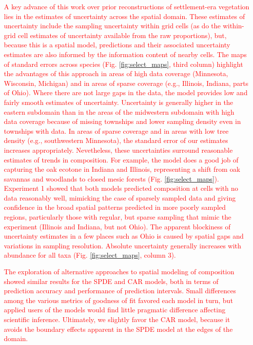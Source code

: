 \documentclass[10pt,letterpaper]{article}
\begin{document}
\textcolor{red}{A key advance of this work over prior reconstructions
of settlement-era vegetation lies in the estimates of uncertainty
across the spatial domain. These estimates of uncertainty include
the sampling uncertainty within grid cells (as do the within-grid
cell estimates of uncertainty available from the raw proportions),
but, because this is a spatial model, predictions and their associated
uncertainty estimates are also informed by the information content
of nearby cells. The maps of standard errors across species (Fig.
\ref{fig:select_maps}, third column) highlight the advantages of
this approach in areas of high data coverage (Minnesota, Wisconsin,
Michigan) and in areas of sparse coverage (e.g., Illinois, Indiana,
parts of Ohio). Where there are not large gaps in the data, the model
provides low and fairly smooth estimates of uncertainty. Uncertainty
is generally higher in the eastern subdomain than in the areas of
the midwestern subdomain with high data coverage because of missing
townships and lower sampling density even in townships with data.
In areas of sparse coverage and in areas with low tree density (e.g.,
southwestern Minnesota), the standard error of our estimates increases
appropriately. Nevetheless, these uncertainties surround reasonable
estimates of trends in composition. For example, the model does a
good job of capturing the oak ecotone in Indiana and Illinois, representing
a shift from oak savannas and woodlands to closed mesic forests (Fig.
\ref{fig:select_maps}). Experiment 1 showed that both models predicted
composition at cells with no data reasonably well, mimicking the case
of sparsely sampled data and giving confidence in the broad spatial
patterns predicted in more poorly sampled regions, particularly those
with regular, but sparse sampling that mimic the experiment (Illinois
and Indiana, but not Ohio). The apparent blockiness of uncertainty
estimates in a few places such as Ohio is caused by spatial gaps and
variations in sampling resolution. Absolute uncertainty generally
increases with abundance for all taxa (Fig. \ref{fig:select_maps},
column 3).}

\textcolor{red}{The exploration of alternative approaches to spatial
modeling of composition showed similar results for the SPDE and CAR
models, both in terms of prediction accuracy and performance of prediction
intervals. Small differences among the various metrics of goodness
of fit favored each model in turn, but applied users of the models
would find little pragmatic difference affecting scientific inference.
Ultimately, we slightly favor the CAR model, because it avoids the
boundary effects apparent in the SPDE model at the edges of the domain.}
\end{document}
